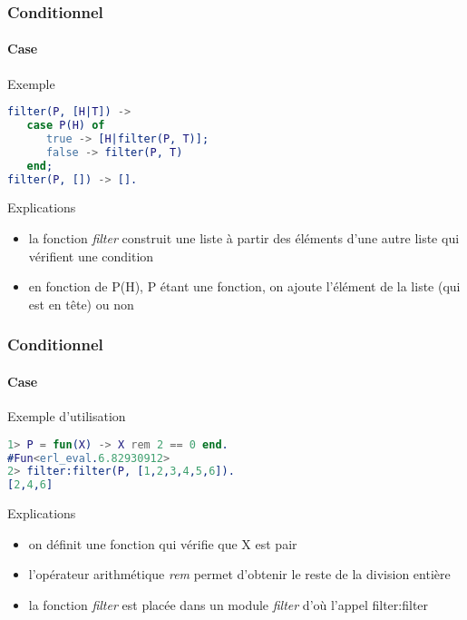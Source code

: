 \begin{frame}[fragile]
  \frametitle{Conditionnel}
  \framesubtitle{Case}

  \begin{exampleblock}{Exemple}
    \begin{lstlisting}[language=erlang]
filter(P, [H|T]) ->
   case P(H) of
      true -> [H|filter(P, T)];
      false -> filter(P, T)
   end;
filter(P, []) -> [].
    \end{lstlisting}
  \end{exampleblock}

  \begin{alertblock}{Explications}
    \begin{itemize}
    \item la fonction \textit{filter} construit une liste à partir des éléments
      d'une autre liste qui vérifient une condition
    \item en fonction de P(H), P étant une fonction, on ajoute l'élément de la
      liste (qui est en tête) ou non
    \end{itemize}
  \end{alertblock}

\end{frame}

\begin{frame}[fragile]
  \frametitle{Conditionnel}
  \framesubtitle{Case}

  \begin{exampleblock}{Exemple d'utilisation}
    \begin{lstlisting}[language=erlang]
1> P = fun(X) -> X rem 2 == 0 end.
#Fun<erl_eval.6.82930912>
2> filter:filter(P, [1,2,3,4,5,6]).
[2,4,6]
    \end{lstlisting}
  \end{exampleblock}

  \begin{alertblock}{Explications}
    \begin{itemize}
    \item on définit une fonction qui vérifie que X est pair
    \item l'opérateur arithmétique \textit{rem} permet d'obtenir le reste
      de la division entière
    \item la fonction \textit{filter} est placée dans un module \textit{filter}
      d'où l'appel filter:filter
    \end{itemize}
  \end{alertblock}

\end{frame}
